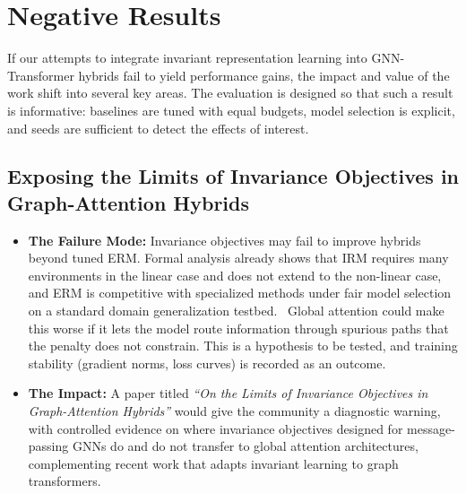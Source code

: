 \documentclass[a4paper,10pt]{article}
\begin{document}
\begin{center}
\end{center}

\section{Negative Results}
\label{sec:negative}

If our attempts to integrate invariant representation learning into GNN-Transformer hybrids fail to yield performance gains, the impact and value of the work shift into several key areas. The evaluation is designed so that such a result is informative: baselines are tuned with equal budgets, model selection is explicit, and seeds are sufficient to detect the effects of interest.~\cite{gulrajani2021lost}

\subsection{Exposing the Limits of Invariance Objectives in Graph-Attention Hybrids}

\begin{itemize}
    \item \textbf{The Failure Mode:} Invariance objectives may fail to improve hybrids beyond tuned ERM. Formal analysis already shows that IRM requires many environments in the linear case and does not extend to the non-linear case,~\cite{rosenfeld2021risks} and ERM is competitive with specialized methods under fair model selection on a standard domain generalization testbed.~\cite{gulrajani2021lost} Global attention could make this worse if it lets the model route information through spurious paths that the penalty does not constrain. This is a hypothesis to be tested, and training stability (gradient norms, loss curves) is recorded as an outcome.
    \item \textbf{The Impact:} A paper titled \emph{``On the Limits of Invariance Objectives in Graph-Attention Hybrids''} would give the community a diagnostic warning, with controlled evidence on where invariance objectives designed for message-passing GNNs do and do not transfer to global attention architectures, complementing recent work that adapts invariant learning to graph transformers.~\cite{liao2026igt}
\end{itemize}
\end{document}
